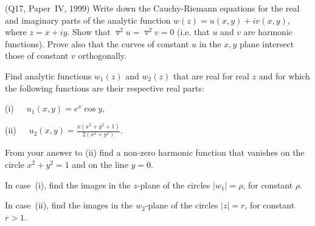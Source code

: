\begin{question} (Q17, Paper~IV, 1999) Write down the
Cauchy-Riemann equations for the real and imaginary parts
of the analytic function $w(z)=u(x,y)+iv(x,y)$, where $z=x+iy$.
Show that $\triangledown^{2}u=\triangledown^{2}v=0$
(i.e. that $u$ and $v$ are harmonic functions). Prove
also that the curves of constant $u$ in the $x,y$ plane
intersect those of constant $v$ orthogonally.

Find analytic functions $w_{1}(z)$ and $w_{2}(z)$ that are real
for real $z$ and for which the following functions are
their respective real parts:

(i)\ \ \ $u_{1}(x,y)=e^{x}\cos y$,

(ii)\ \ \ ${\displaystyle u_{2}(x,y)=
\frac{x(x^{2}+y^{2}+1)}{2(x^{2}+y^{2})}.}$

From your answer to (ii) find a non-zero harmonic function that
vanishes on the circle $x^{2}+y^{2}=1$ and on the line
$y=0$.

In case~(i), find the images in the $z$-plane of the circles
$|w_{1}|=\rho$, for constant $\rho$.

In case~(ii), find the images in the $w_{2}$-plane of the circles
$|z|=r$, for constant $r>1$.
\end{question}

